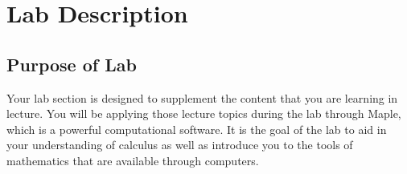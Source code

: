 \chapter{Lab Description}
\label{chp:lab_syllabus}




\section{Purpose of Lab}
\label{sec:purpose_of_lab}

Your lab section is designed to supplement the content that you are learning in lecture. You will be applying those lecture topics during the lab through Maple, which is a powerful computational software. It is the goal of the lab to aid in your understanding of calculus as well as introduce you to the tools of mathematics that are available through computers.

